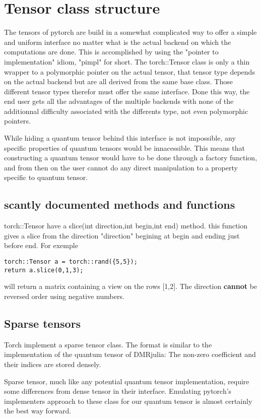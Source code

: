 \documentclass[15pt]{report}
\begin{document}
\section{Tensor class structure}

The tensors of pytorch are build in a somewhat complicated way to offer a simple and uniform interface no matter what is the actual backend on which the computations are done.
This is accomplished by using the "pointer to implementation" idiom, "pimpl" for short. The torch::Tensor class is only a thin wrapper to a polymorphic pointer on the actual tensor, that tensor type depends on the actual backend but are all derived from the same base class. Those different tensor types therefor must offer the same interface.
Done this way, the end user gets all the advantages of the multiple backends with none of the additionnal difficulty associated with the differents type, not even polymorphic pointers.

While hiding a quantum tensor behind this interface is not impossible, any specific properties of quantum tensors would be innacessible. This means that constructing a quantum tensor would have to be done through a factory function, and from then on the user cannot do any direct manipulation to a property specific to quantum tensor.

\subsection{scantly documented methods and functions}
torch::Tensor have a slice(int direction,int begin,int end) method. this function gives a slice from the direction "direction" begining at begin and ending just before end.
For exemple
\begin{verbatim}
torch::Tensor a = torch::rand({5,5});
return a.slice(0,1,3); 
\end{verbatim}
will return a matrix containing a view on the rows [1,2].
The direction \textbf{cannot} be reversed order using negative numbers.


\subsection{Sparse tensors}
Torch implement a sparse tensor class. The format is similar to the implementation of the quantum tensor of DMRjulia: The non-zero coefficient and their indices are stored densely.

Sparse tensor, much like any potential quantum tensor implementation, require some differences from dense tensor in their interface. Emulating pytorch's implementers approach to these class for our quantum tensor is almost certainly the best way forward.
\end{document}
